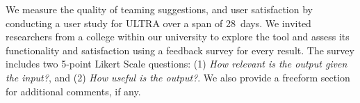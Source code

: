 We measure the quality of teaming suggestions, and user satisfaction by conducting a user study for ULTRA
over a span of 28~days. We invited researchers from a college within our university to explore the tool and assess its functionality and satisfaction using a feedback survey for every result. The survey includes two 5-point Likert Scale questions: (1) \textit{How relevant is the output given the input?}, and (2) \textit{How useful is the output?}. We also provide a freeform section for additional comments, if any. %
